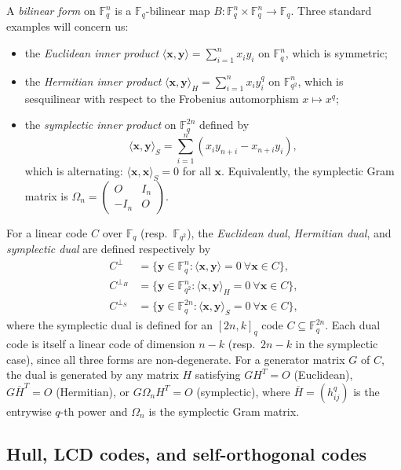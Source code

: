 \documentclass[11pt]{article}
\theoremstyle{plain}
\theoremstyle{remark}
\newcommand{\F}{\mathbb{F}}
\begin{document}
A \emph{bilinear form} on $\F_q^n$ is a $\F_q$-bilinear map $B : \F_q^n \times \F_q^n \to \F_q$.
Three standard examples will concern us:
\begin{itemize}
\item the \emph{Euclidean inner product} $\langle \mathbf{x}, \mathbf{y} \rangle = \sum_{i=1}^n x_i y_i$
      on $\F_q^n$, which is symmetric;
\item the \emph{Hermitian inner product} $\langle \mathbf{x}, \mathbf{y} \rangle_H = \sum_{i=1}^n x_i y_i^q$
      on $\F_{q^2}^n$, which is sesquilinear with respect to the Frobenius automorphism $x \mapsto x^q$;
\item the \emph{symplectic inner product} on $\F_q^{2n}$ defined by
      \[
        \langle \mathbf{x}, \mathbf{y} \rangle_S = \sum_{i=1}^{n} (x_i y_{n+i} - x_{n+i} y_i),
      \]
      which is alternating: $\langle \mathbf{x}, \mathbf{x} \rangle_S = 0$ for all $\mathbf{x}$.
      Equivalently, the symplectic Gram matrix is $\Omega_n = \begin{pmatrix} O & I_n \\ -I_n & O \end{pmatrix}$.
\end{itemize}
For a linear code $C$ over $\F_q$ (resp.\ $\F_{q^2}$), the \emph{Euclidean dual},
\emph{Hermitian dual}, and \emph{symplectic dual} are defined respectively by
\begin{align*}
  C^\perp &= \{\mathbf{y} \in \F_q^n : \langle \mathbf{x}, \mathbf{y} \rangle = 0 \ \forall \mathbf{x} \in C\}, \\
  C^{\perp_H} &= \{\mathbf{y} \in \F_{q^2}^n : \langle \mathbf{x}, \mathbf{y} \rangle_H = 0 \ \forall \mathbf{x} \in C\}, \\
  C^{\perp_S} &= \{\mathbf{y} \in \F_q^{2n} : \langle \mathbf{x}, \mathbf{y} \rangle_S = 0 \ \forall \mathbf{x} \in C\},
\end{align*}
where the symplectic dual is defined for an $[2n, k]_q$ code $C \subseteq \F_q^{2n}$.
Each dual code is itself a linear code of dimension $n - k$ (resp.\ $2n - k$ in the symplectic case),
since all three forms are non-degenerate.
For a generator matrix $G$ of $C$, the dual is generated by any matrix $H$ satisfying
$G H^T = O$ (Euclidean), $G \overline{H}^T = O$ (Hermitian), or $G \Omega_n H^T = O$ (symplectic),
where $\overline{H} = (h_{ij}^q)$ is the entrywise $q$-th power
and $\Omega_n$ is the symplectic Gram matrix.

\subsection{Hull, LCD codes, and self-orthogonal codes}\label{sec:prelim-hull}
\end{document}
